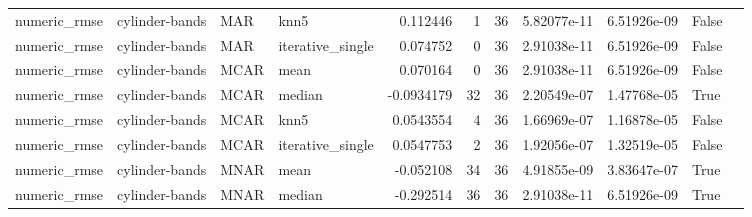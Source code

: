 \begin{table}[ht]
\begin{tabular}{llllrrrrrll}
 numeric\_rmse           & cylinder-bands       & MAR         & knn5             &      0.112446    &                   1 &      36 & 5.82077e-11 & 6.51926e-09 & False              &                                                                                                                    \\
 numeric\_rmse           & cylinder-bands       & MAR         & iterative\_single &      0.074752    &                   0 &      36 & 2.91038e-11 & 6.51926e-09 & False              &                                                                                                                    \\
 numeric\_rmse           & cylinder-bands       & MCAR        & mean             &      0.070164    &                   0 &      36 & 2.91038e-11 & 6.51926e-09 & False              &                                                                                                                    \\
 numeric\_rmse           & cylinder-bands       & MCAR        & median           &     -0.0934179   &                  32 &      36 & 2.20549e-07 & 1.47768e-05 & True               &                                                                                                                    \\
 numeric\_rmse           & cylinder-bands       & MCAR        & knn5             &      0.0543554   &                   4 &      36 & 1.66969e-07 & 1.16878e-05 & False              &                                                                                                                    \\
 numeric\_rmse           & cylinder-bands       & MCAR        & iterative\_single &      0.0547753   &                   2 &      36 & 1.92056e-07 & 1.32519e-05 & False              &                                                                                                                    \\
 numeric\_rmse           & cylinder-bands       & MNAR        & mean             &     -0.052108    &                  34 &      36 & 4.91855e-09 & 3.83647e-07 & True               &                                                                                                                    \\
 numeric\_rmse           & cylinder-bands       & MNAR        & median           &     -0.292514    &                  36 &      36 & 2.91038e-11 & 6.51926e-09 & True               &                                                                                                                    \\

\end{tabular}
\end{table}

